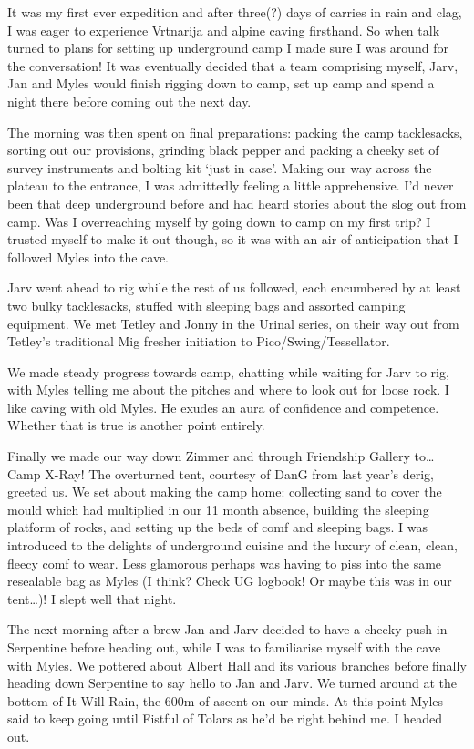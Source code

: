 It was my first ever expedition and after three(?) days of carries in
rain and clag, I was eager to experience Vrtnarija and alpine caving
firsthand. So when talk turned to plans for setting up underground camp
I made sure I was around for the conversation! It was eventually decided
that a team comprising myself, Jarv, Jan and Myles would finish rigging
down to camp, set up camp and spend a night there before coming out the
next day.

The morning was then spent on final preparations: packing the camp
tacklesacks, sorting out our provisions, grinding black pepper and
packing a cheeky set of survey instruments and bolting kit `just in
case'. Making our way across the plateau to the entrance, I was
admittedly feeling a little apprehensive. I'd never been that deep
underground before and had heard stories about the slog out from camp.
Was I overreaching myself by going down to camp on my first trip? I
trusted myself to make it out though, so it was with an air of
anticipation that I followed Myles into the cave.

Jarv went ahead to rig while the rest of us followed, each encumbered by
at least two bulky tacklesacks, stuffed with sleeping bags and assorted
camping equipment. We met Tetley and Jonny in the Urinal series, on
their way out from Tetley's traditional Mig fresher initiation to
Pico/Swing/Tessellator.

We made steady progress towards camp, chatting while waiting for Jarv to
rig, with Myles telling me about the pitches and where to look out for
loose rock. I like caving with old Myles. He exudes an aura of
confidence and competence. Whether that is true is another point
entirely.

Finally we made our way down Zimmer and through Friendship Gallery
to\ldots{} Camp X-Ray! The overturned tent, courtesy of DanG from last
year's derig, greeted us. We set about making the camp home: collecting
sand to cover the mould which had multiplied in our 11 month absence,
building the sleeping platform of rocks, and setting up the beds of comf
and sleeping bags. I was introduced to the delights of underground
cuisine and the luxury of clean, clean, fleecy comf to wear. Less
glamorous perhaps was having to piss into the same resealable bag as
Myles (I think? Check UG logbook! Or maybe this was in our
tent\ldots{})! I slept well that night.

The next morning after a brew Jan and Jarv decided to have a cheeky push
in Serpentine before heading out, while I was to familiarise myself with
the cave with Myles. We pottered about Albert Hall and its various
branches before finally heading down Serpentine to say hello to Jan and
Jarv. We turned around at the bottom of It Will Rain, the 600m of ascent
on our minds. At this point Myles said to keep going until Fistful of
Tolars as he'd be right behind me. I headed out.

